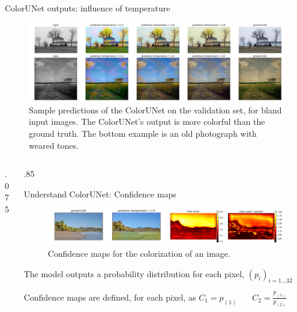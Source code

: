 \documentclass[final]{beamer}
\newlength{\twocolwid}
\begin{document}
\begin{frame}[t]
\begin{columns}[t]
\begin{column}{\twocolwid}
\begin{block}{ColorUNet outputs: influence of temperature}
  \begin{figure}
  \begin{center}
  \includegraphics[width=.8\twocolwid]{img/better_cropped}
  \caption{Sample predictions of the ColorUNet on the validation set, for bland input images. The ColorUNet’s output is more colorful than the ground truth. The bottom example is an old photograph with weared tones.}
  \label{better}
  \end{center}
  \end{figure}

  \end{block}

  \begin{columns}[t,totalwidth=.7\twocolwid] %
    \begin{column}{.075\twocolwid}\end{column}
    \begin{column}{.85\twocolwid}

    \begin{alertblock}{Understand ColorUNet: Confidence maps}

    \begin{figure}
    \begin{center}
    \includegraphics[width=.6\twocolwid]{img/confidence}
    \caption{Confidence maps for the colorization of an image.}
    \label{confidence}
    \end{center}
    \end{figure}

    The model outputs a probability distribution for each pixel, $(p_i)_{i=1...32}$

    Confidence maps are defined, for each pixel, as
    $C_1 = p_{(1)}\ \ \ \ \ \ \ \  C_2 = \frac{p_{(1)}}{p_{(2)}}$
    \end{alertblock}


\end{column}
\end{columns}
\end{column}
\end{columns}
\end{frame}
\end{document}
